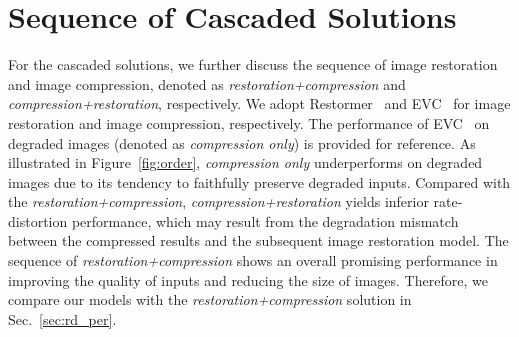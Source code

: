 \vspace{-10pt}\section{Sequence of Cascaded Solutions}\label{supp_sec:ablation} \vspace{-8pt}
 For the cascaded solutions, we further discuss the sequence of image restoration and image compression, denoted as \textit{restoration+compression} and \textit{compression+restoration}, respectively. We adopt Restormer~\cite{restormer} and EVC~\cite{evc} for image restoration and image compression, respectively.   The performance of EVC~\cite{evc} on degraded images (denoted as \textit{compression only}) is provided for reference. As illustrated in Figure~\ref{fig:order}, \textit{compression only} underperforms on degraded images due to its tendency to faithfully preserve degraded inputs. Compared with the \textit{restoration+compression},  \textit{compression+restoration} yields inferior rate-distortion performance, which may result from the degradation mismatch between the compressed results and the subsequent image restoration model. The sequence of \textit{restoration+compression} shows an overall promising performance in improving the quality of inputs and reducing the size of images. Therefore, we compare our models with the \textit{restoration+compression} solution in Sec.~\ref{sec:rd_per}.

 


 

 
  
\begin{table}[t]
\vspace{-4pt}
  \caption{Results on the task of \hl{OD} and \hl{MDE}, where the best and second best results are highlighted with \textbf{bold} and \uline{underline}. }\vspace{-0.13in}
\label{tab:dection}
\end{table}


